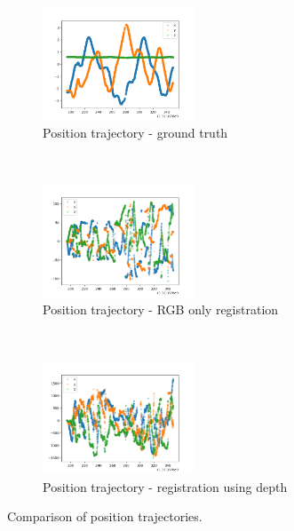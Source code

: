 \documentclass[12pt,a4paper]{article}
\begin{document}
\begin{figure}[t!]
  \centering
  \begin{subfigure}[t]{0.3\textwidth}
  \centering
    \includegraphics[width=45mm]{reg_graphs/180_no-rot-d/trj_gt.PNG}
  \caption{Position trajectory - ground truth}
  \end{subfigure} %
  ~
  \begin{subfigure}[t]{0.3\textwidth}
  \centering
    \includegraphics[width=45mm]{reg_graphs/180_no-rot-d/trj_rgb.PNG}
  \caption{Position trajectory - RGB only registration}
  \end{subfigure}%
  ~
  \begin{subfigure}[t]{0.3\textwidth}
  \centering
    \includegraphics[width=45mm]{reg_graphs/180_no-rot-d/trj_d.PNG}
  \caption{Position trajectory - registration using depth}
  \end{subfigure}
  \caption{Comparison of position trajectories.}
\end{figure}
\end{document}
